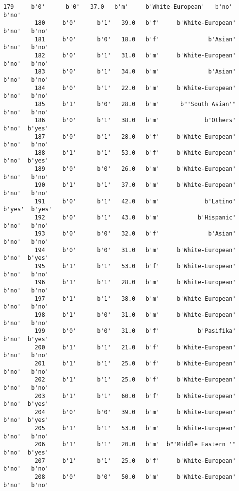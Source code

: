 \documentclass[11pt]{article}
\begin{document}
\begin{Verbatim}[commandchars=\\\{\}]
         179     b'0'      b'0'   37.0   b'm'     b'White-European'   b'no'   b'no'   
         180     b'0'      b'1'   39.0   b'f'     b'White-European'   b'no'   b'no'   
         181     b'0'      b'0'   18.0   b'f'              b'Asian'   b'no'   b'no'   
         182     b'0'      b'1'   31.0   b'm'     b'White-European'   b'no'   b'no'   
         183     b'0'      b'1'   34.0   b'm'              b'Asian'   b'no'   b'no'   
         184     b'0'      b'1'   22.0   b'm'     b'White-European'   b'no'   b'no'   
         185     b'1'      b'0'   28.0   b'm'      b"'South Asian'"   b'no'   b'no'   
         186     b'0'      b'1'   38.0   b'm'             b'Others'   b'no'  b'yes'   
         187     b'0'      b'1'   28.0   b'f'     b'White-European'   b'no'   b'no'   
         188     b'1'      b'1'   53.0   b'f'     b'White-European'   b'no'  b'yes'   
         189     b'0'      b'0'   26.0   b'm'     b'White-European'   b'no'   b'no'   
         190     b'1'      b'1'   37.0   b'm'     b'White-European'   b'no'   b'no'   
         191     b'0'      b'1'   42.0   b'm'             b'Latino'  b'yes'  b'yes'   
         192     b'0'      b'1'   43.0   b'm'           b'Hispanic'   b'no'   b'no'   
         193     b'0'      b'0'   32.0   b'f'              b'Asian'   b'no'   b'no'   
         194     b'0'      b'0'   31.0   b'm'     b'White-European'   b'no'  b'yes'   
         195     b'1'      b'1'   53.0   b'f'     b'White-European'   b'no'   b'no'   
         196     b'1'      b'1'   28.0   b'm'     b'White-European'   b'no'   b'no'   
         197     b'1'      b'1'   38.0   b'm'     b'White-European'   b'no'   b'no'   
         198     b'1'      b'0'   31.0   b'm'     b'White-European'   b'no'   b'no'   
         199     b'0'      b'0'   31.0   b'f'           b'Pasifika'   b'no'  b'yes'   
         200     b'1'      b'1'   21.0   b'f'     b'White-European'   b'no'   b'no'   
         201     b'1'      b'1'   25.0   b'f'     b'White-European'   b'no'   b'no'   
         202     b'1'      b'1'   25.0   b'f'     b'White-European'   b'no'   b'no'   
         203     b'1'      b'1'   60.0   b'f'     b'White-European'   b'no'  b'yes'   
         204     b'0'      b'0'   39.0   b'm'     b'White-European'   b'no'  b'yes'   
         205     b'1'      b'1'   53.0   b'm'     b'White-European'   b'no'   b'no'   
         206     b'1'      b'1'   20.0   b'm'  b"'Middle Eastern '"   b'no'  b'yes'   
         207     b'1'      b'1'   25.0   b'f'     b'White-European'   b'no'   b'no'   
         208     b'0'      b'0'   50.0   b'm'     b'White-European'   b'no'   b'no'   

\end{Verbatim}
\end{document}
